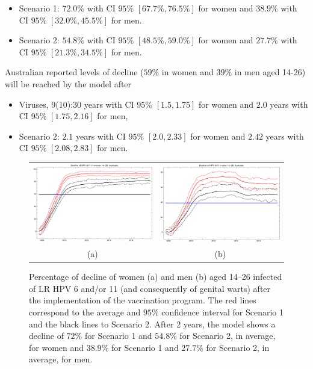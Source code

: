 \begin{itemize}
	\item Scenario 1: $72.0\%$ with CI $95\%$ $[67.7\%, 76.5\%]$ for women and $38.9\%$ with CI $95\%$ $[32.0\%, 45.5\%]$ for men. 
	\item Scenario 2: $54.8\%$ with CI $95\%$ $[48.5\%, 59.0\%]$ for women and $27.7\%$ with CI $95\%$ $[21.3\%, 34.5\%]$ for men. 
\end{itemize}

Australian reported levels of decline ($59\%$ in women and $39\%$ in men aged 14-26) will be reached by the model after

\begin{itemize}
	\item Viruses, 9(10):30 years with CI $95\%$ $[1.5, 1.75]$ for women and $2.0$ years with CI $95\%$ $[1.75, 2.16]$ for men,
	\item Scenario 2: $2.1$ years with CI $95\%$ $[2.0, 2.33]$ for women and $2.42$ years with CI $95\%$ $[2.08, 2.83]$ for men.
\end{itemize}

\begin{figure}[!]
	\centering
	\begin{tabular}{cc}
		\includegraphics[width=0.5\linewidth]{IMGs/3.-Australia/Decl_muj_14_26_verr_Australia.pdf}	& 
		\includegraphics[width=0.5\linewidth]{IMGs/3.-Australia/Decl_hom_14_26_verr_Australia.pdf}  \\ 
		(a)	& (b) 
	\end{tabular} 
	\caption{Percentage of decline of women (a) and men (b) aged 14–26 infected of LR HPV 6 and/or 11 (and consequently of genital warts) after the implementation of the vaccination program. The red lines correspond to the average and $95\%$ confidence interval for Scenario 1 and the black lines to Scenario 2. After 2 years, the model shows a decline of $72\%$ for Scenario 1 and $54.8\%$ for Scenario 2, in average, for women and $38.9\%$ for Scenario 1 and $27.7\%$ for Scenario 2, in average, for men.}
	\label{fig:decline_AUS_6_11}
\end{figure}

